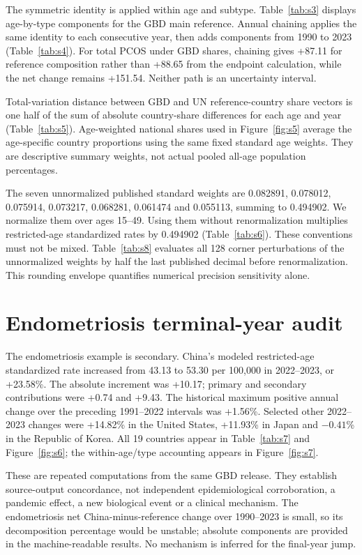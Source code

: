 \documentclass[11pt,a4paper]{article}
\begin{document}
The symmetric identity is applied within age and subtype. Table~\ref{tab:s3} displays age-by-type components for the GBD main reference. Annual chaining applies the same identity to each consecutive year, then adds components from 1990 to 2023 (Table~\ref{tab:s4}). For total PCOS under GBD shares, chaining gives +87.11 for reference composition rather than +88.65 from the endpoint calculation, while the net change remains +151.54. Neither path is an uncertainty interval.

Total-variation distance between GBD and UN reference-country share vectors is one half of the sum of absolute country-share differences for each age and year (Table~\ref{tab:s5}). Age-weighted national shares used in Figure~\ref{fig:s5} average the age-specific country proportions using the same fixed standard age weights. They are descriptive summary weights, not actual pooled all-age population percentages.

The seven unnormalized published standard weights are 0.082891, 0.078012, 0.075914, 0.073217, 0.068281, 0.061474 and 0.055113, summing to 0.494902. We normalize them over ages 15--49. Using them without renormalization multiplies restricted-age standardized rates by 0.494902 (Table~\ref{tab:s6}). These conventions must not be mixed. Table~\ref{tab:s8} evaluates all 128 corner perturbations of the unnormalized weights by half the last published decimal before renormalization. This rounding envelope quantifies numerical precision sensitivity alone.

\section{Endometriosis terminal-year audit}
The endometriosis example is secondary. China's modeled restricted-age standardized rate increased from 43.13 to 53.30 per 100,000 in 2022--2023, or +23.58\%. The absolute increment was +10.17; primary and secondary contributions were +0.74 and +9.43. The historical maximum positive annual change over the preceding 1991--2022 intervals was +1.56\%. Selected other 2022--2023 changes were +14.82\% in the United States, +11.93\% in Japan and $-0.41$\% in the Republic of Korea. All 19 countries appear in Table~\ref{tab:s7} and Figure~\ref{fig:s6}; the within-age/type accounting appears in Figure~\ref{fig:s7}.

These are repeated computations from the same GBD release. They establish source-output concordance, not independent epidemiological corroboration, a pandemic effect, a new biological event or a clinical mechanism. The endometriosis net China-minus-reference change over 1990--2023 is small, so its decomposition percentage would be unstable; absolute components are provided in the machine-readable results. No mechanism is inferred for the final-year jump.
\end{document}

